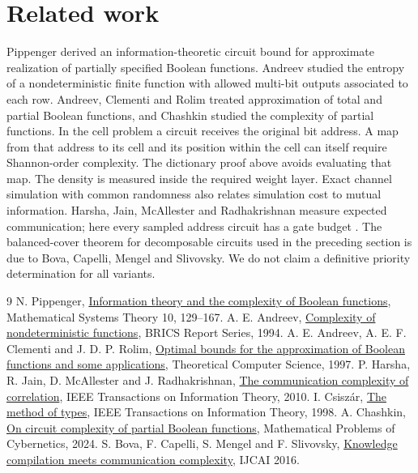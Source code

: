 \documentclass[11pt]{article}
\begin{document}
\section{Related work}
Pippenger derived an information-theoretic circuit bound for approximate realization of partially specified Boolean functions. Andreev studied the entropy of a nondeterministic finite function with allowed multi-bit outputs associated to each row. Andreev, Clementi and Rolim treated approximation of total and partial Boolean functions, and Chashkin studied the complexity of partial functions. In the cell problem a circuit receives the original bit address. A map from that address to its cell and its position within the cell can itself require Shannon-order complexity. The dictionary proof above avoids evaluating that map. The density is measured inside the required weight layer. Exact channel simulation with common randomness also relates simulation cost to mutual information. Harsha, Jain, McAllester and Radhakrishnan measure expected communication; here every sampled address circuit has a gate budget \cite{hjmr}. The balanced-cover theorem for decomposable circuits used in the preceding section is due to Bova, Capelli, Mengel and Slivovsky. We do not claim a definitive priority determination for all variants.\par
\begin{thebibliography}{9}
 N. Pippenger, \href{https://doi.org/10.1007/BF01683269}{Information theory and the complexity of Boolean functions}, Mathematical Systems Theory 10, 129--167.
 A. E. Andreev, \href{https://doi.org/10.7146/brics.v1i2.21668}{Complexity of nondeterministic functions}, BRICS Report Series, 1994.
 A. E. Andreev, A. E. F. Clementi and J. D. P. Rolim, \href{https://eccc.weizmann.ac.il/eccc-reports/1995/TR95-041/index.html}{Optimal bounds for the approximation of Boolean functions and some applications}, Theoretical Computer Science, 1997.
 P. Harsha, R. Jain, D. McAllester and J. Radhakrishnan, \href{https://www.tcs.tifr.res.in/~prahladh/papers/HJMR/HJMR2010.pdf}{The communication complexity of correlation}, IEEE Transactions on Information Theory, 2010.
 I. Csisz\'ar, \href{https://doi.org/10.1109/18.720546}{The method of types}, IEEE Transactions on Information Theory, 1998.
 A. Chashkin, \href{https://doi.org/10.20948/mvk-2024-152}{On circuit complexity of partial Boolean functions}, Mathematical Problems of Cybernetics, 2024.
 S. Bova, F. Capelli, S. Mengel and F. Slivovsky, \href{https://ijcai.org/proceedings/2016/147}{Knowledge compilation meets communication complexity}, IJCAI 2016.
\end{thebibliography}
\end{document}

